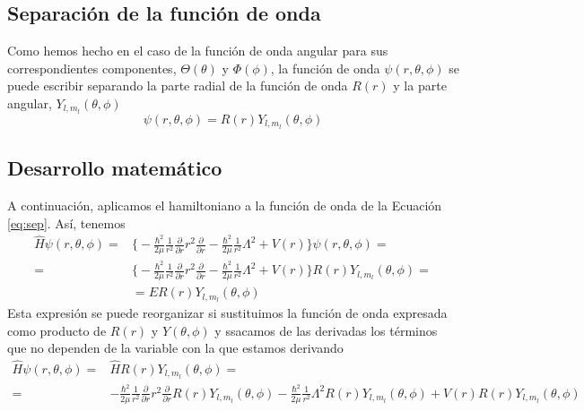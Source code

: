 \documentclass[notitlepage, amsmath,amssymb,
 aps,12pt,tightenlines]{revtex4-1}
\begin{document}
\subsection*{Separación de la función de onda}
Como hemos hecho en el caso de la función de onda angular
para sus correspondientes componentes, $\Theta(\theta)$ y
$\Phi(\phi)$, la función de onda  $\psi(r,\theta,\phi)$ 
se puede escribir separando la parte radial de la función
de onda $R(r)$ y la parte angular, $Y_{l,m_l}(\theta, \phi)$
\begin{equation}
    \psi(r,\theta,\phi) = R(r) Y_{l,m_l}(\theta, \phi)
    \label{eq:sep}
\end{equation}

\subsection*{Desarrollo matemático}
A continuación, aplicamos el hamiltoniano a la función de onda
de la Ecuación \ref{eq:sep}. Así, tenemos
\begin{equation}
\begin{split}
    \hat{H}\psi(r,\theta,\phi)=&
    \bigg\{
    -\frac{\hbar^2}{2\mu} \frac{1}{r^2}\frac{\partial}{\partial r}r^2\frac{\partial}{\partial r} 
    -\frac{\hbar^2}{2\mu} \frac{1}{r^2}\Lambda^2
    +V(r)\bigg\}\psi(r,\theta,\phi)= \\
    =&
    \bigg\{
    -\frac{\hbar^2}{2\mu} \frac{1}{r^2}\frac{\partial}{\partial r}r^2\frac{\partial}{\partial r} 
    -\frac{\hbar^2}{2\mu} \frac{1}{r^2}\Lambda^2
    +V(r)\bigg\}R(r) Y_{l,m_l}(\theta, \phi)=\\
    &=ER(r) Y_{l,m_l}(\theta, \phi)
\end{split}
\end{equation}
Esta expresión se puede reorganizar si sustituimos la función de onda expresada 
como producto de $R(r)$ y $Y(\theta, \phi)$ y ssacamos de las 
derivadas los términos que no
dependen de la variable con la que estamos derivando
\begin{equation}
   \begin{split}
       \hat{H}\psi(r,\theta,\phi)=&\hat{H}R(r) Y_{l,m_l}(\theta, \phi)=\\ 
       =&-\frac{\hbar^2}{2\mu} \frac{1}{r^2}\frac{\partial}{\partial r}r^2\frac{\partial}{\partial r} R(r) Y_{l,m_l}(\theta, \phi)  
       -\frac{\hbar^2}{2\mu} \frac{1}{r^2}\Lambda^2R(r) Y_{l,m_l}(\theta, \phi)
      + V(r)R(r) Y_{l,m_l}(\theta, \phi)
   \end{split} 
\end{equation}
\end{document}
